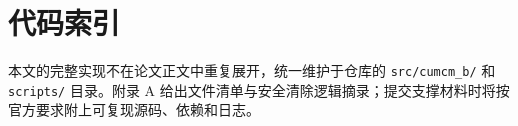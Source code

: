 \section{代码索引}
本文的完整实现不在论文正文中重复展开，统一维护于仓库的 \nolinkurl{src/cumcm_b/} 和 \nolinkurl{scripts/} 目录。附录 A 给出文件清单与安全清除逻辑摘录；提交支撑材料时将按官方要求附上可复现源码、依赖和日志。
